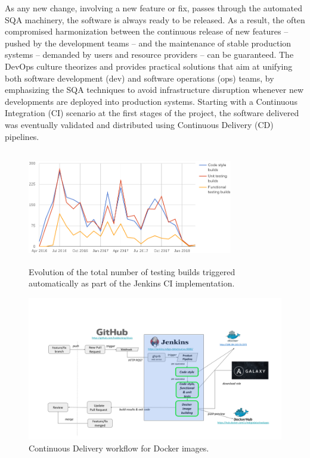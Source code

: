 As any new change, involving a new feature or fix, passes through the automated
SQA machinery, the software is always ready to be released. As a result, the often compromised harmonization
between the continuous release of new features -- pushed by the development teams -- and the maintenance of
stable production systems -- demanded by users and resource providers -- can be guaranteed. The DevOps culture
theorizes and provides practical solutions that aim at unifying both software development (dev) and software
operations (ops) teams, by emphasizing the SQA techniques to avoid infrastructure disruption whenever new
developments are deployed into production systems. Starting with a Continuous Integration (CI) scenario at the first stages of the project, the software delivered
was eventually validated and distributed using Continuous Delivery (CD) pipelines.

\begin{figure}[ht]
\centering
\includegraphics[width=0.8\textwidth, height=50mm]{images/jenkins_CI_builds.png}
\caption{Evolution of the total number of testing builds triggered automatically as part of the Jenkins CI implementation.}
\label{fig:fig_jenkins_CI_builds}
\end{figure}

\begin{figure}[ht]
\centering
\includegraphics[width=\textwidth]{images/devops.png}
\caption{Continuous Delivery workflow for Docker images.}
\label{fig:fig_CD}
\end{figure}


